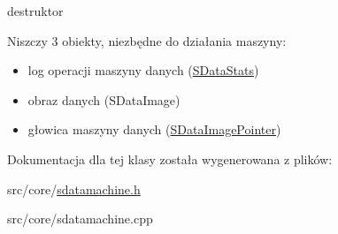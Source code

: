 destruktor 

Niszczy 3 obiekty, niezbędne do działania maszyny:\begin{itemize}
\item log operacji maszyny danych (\hyperlink{classSDataStats}{SDataStats})\item obraz danych (SDataImage)\item głowica maszyny danych (\hyperlink{classSDataImagePointer}{SDataImagePointer}) \end{itemize}


Dokumentacja dla tej klasy została wygenerowana z plików:\begin{CompactItemize}
\item 
src/core/\hyperlink{sdatamachine_8h}{sdatamachine.h}\item 
src/core/sdatamachine.cpp\end{CompactItemize}

